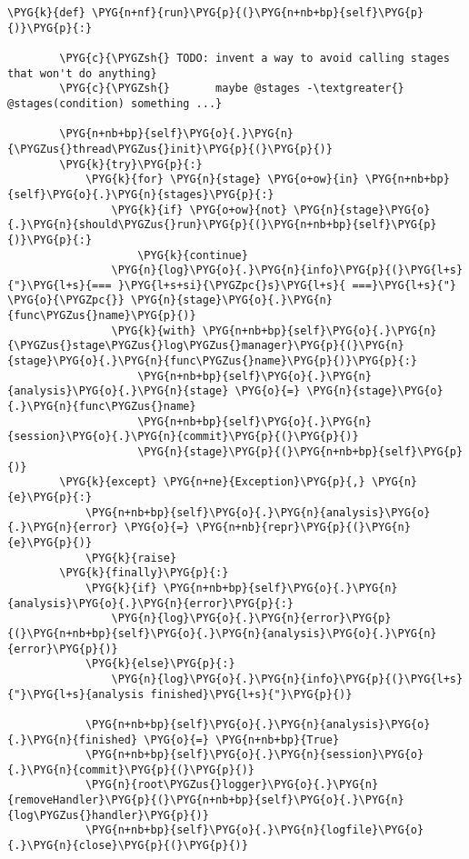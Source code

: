 \begin{Verbatim}[commandchars=\\\{\}]
    \PYG{k}{def} \PYG{n+nf}{run}\PYG{p}{(}\PYG{n+nb+bp}{self}\PYG{p}{)}\PYG{p}{:}

        \PYG{c}{\PYGZsh{} TODO: invent a way to avoid calling stages that won't do anything}
        \PYG{c}{\PYGZsh{}       maybe @stages -\textgreater{} @stages(condition) something ...}

        \PYG{n+nb+bp}{self}\PYG{o}{.}\PYG{n}{\PYGZus{}thread\PYGZus{}init}\PYG{p}{(}\PYG{p}{)}
        \PYG{k}{try}\PYG{p}{:}
            \PYG{k}{for} \PYG{n}{stage} \PYG{o+ow}{in} \PYG{n+nb+bp}{self}\PYG{o}{.}\PYG{n}{stages}\PYG{p}{:}
                \PYG{k}{if} \PYG{o+ow}{not} \PYG{n}{stage}\PYG{o}{.}\PYG{n}{should\PYGZus{}run}\PYG{p}{(}\PYG{n+nb+bp}{self}\PYG{p}{)}\PYG{p}{:}
                    \PYG{k}{continue}
                \PYG{n}{log}\PYG{o}{.}\PYG{n}{info}\PYG{p}{(}\PYG{l+s}{"}\PYG{l+s}{=== }\PYG{l+s+si}{\PYGZpc{}s}\PYG{l+s}{ ===}\PYG{l+s}{"} \PYG{o}{\PYGZpc{}} \PYG{n}{stage}\PYG{o}{.}\PYG{n}{func\PYGZus{}name}\PYG{p}{)}
                \PYG{k}{with} \PYG{n+nb+bp}{self}\PYG{o}{.}\PYG{n}{\PYGZus{}stage\PYGZus{}log\PYGZus{}manager}\PYG{p}{(}\PYG{n}{stage}\PYG{o}{.}\PYG{n}{func\PYGZus{}name}\PYG{p}{)}\PYG{p}{:}
                    \PYG{n+nb+bp}{self}\PYG{o}{.}\PYG{n}{analysis}\PYG{o}{.}\PYG{n}{stage} \PYG{o}{=} \PYG{n}{stage}\PYG{o}{.}\PYG{n}{func\PYGZus{}name}
                    \PYG{n+nb+bp}{self}\PYG{o}{.}\PYG{n}{session}\PYG{o}{.}\PYG{n}{commit}\PYG{p}{(}\PYG{p}{)}
                    \PYG{n}{stage}\PYG{p}{(}\PYG{n+nb+bp}{self}\PYG{p}{)}
        \PYG{k}{except} \PYG{n+ne}{Exception}\PYG{p}{,} \PYG{n}{e}\PYG{p}{:}
            \PYG{n+nb+bp}{self}\PYG{o}{.}\PYG{n}{analysis}\PYG{o}{.}\PYG{n}{error} \PYG{o}{=} \PYG{n+nb}{repr}\PYG{p}{(}\PYG{n}{e}\PYG{p}{)}
            \PYG{k}{raise}
        \PYG{k}{finally}\PYG{p}{:}
            \PYG{k}{if} \PYG{n+nb+bp}{self}\PYG{o}{.}\PYG{n}{analysis}\PYG{o}{.}\PYG{n}{error}\PYG{p}{:}
                \PYG{n}{log}\PYG{o}{.}\PYG{n}{error}\PYG{p}{(}\PYG{n+nb+bp}{self}\PYG{o}{.}\PYG{n}{analysis}\PYG{o}{.}\PYG{n}{error}\PYG{p}{)}
            \PYG{k}{else}\PYG{p}{:}
                \PYG{n}{log}\PYG{o}{.}\PYG{n}{info}\PYG{p}{(}\PYG{l+s}{"}\PYG{l+s}{analysis finished}\PYG{l+s}{"}\PYG{p}{)}

            \PYG{n+nb+bp}{self}\PYG{o}{.}\PYG{n}{analysis}\PYG{o}{.}\PYG{n}{finished} \PYG{o}{=} \PYG{n+nb+bp}{True}
            \PYG{n+nb+bp}{self}\PYG{o}{.}\PYG{n}{session}\PYG{o}{.}\PYG{n}{commit}\PYG{p}{(}\PYG{p}{)}
            \PYG{n}{root\PYGZus{}logger}\PYG{o}{.}\PYG{n}{removeHandler}\PYG{p}{(}\PYG{n+nb+bp}{self}\PYG{o}{.}\PYG{n}{log\PYGZus{}handler}\PYG{p}{)}
            \PYG{n+nb+bp}{self}\PYG{o}{.}\PYG{n}{logfile}\PYG{o}{.}\PYG{n}{close}\PYG{p}{(}\PYG{p}{)}
\end{Verbatim}


